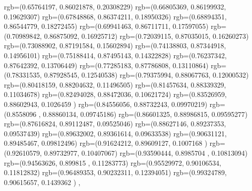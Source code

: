 {{{		  rgb=(0.65764197,  0.86021878,  0.20308229)
		  rgb=(0.66805369,  0.86199932,  0.19629307)
		  rgb=(0.67848868,  0.86374211,  0.18950326)
		  rgb=(0.68894351,  0.86544779,  0.18272455)
		  rgb=(0.69941463,  0.86711711,  0.17597055)
		  rgb=(0.70989842,  0.86875092,  0.16925712)
		  rgb=(0.72039115,  0.87035015,  0.16260273)
		  rgb=(0.73088902,  0.87191584,  0.15602894)
		  rgb=(0.74138803,  0.87344918,  0.14956101)
		  rgb=(0.75188414,  0.87495143,  0.14322828)
		  rgb=(0.76237342,  0.87642392,  0.13706449)
		  rgb=(0.77285183,  0.87786808,  0.13110864)
		  rgb=(0.78331535,  0.87928545,  0.12540538)
		  rgb=(0.79375994,  0.88067763,  0.12000532)
		  rgb=(0.80418159,  0.88204632,  0.11496505)
		  rgb=(0.81457634,  0.88339329,  0.11034678)
		  rgb=(0.82494028,  0.88472036,  0.10621724)
		  rgb=(0.83526959,  0.88602943,  0.1026459 )
		  rgb=(0.84556056,  0.88732243,  0.09970219)
		  rgb=(0.8558096 ,  0.88860134,  0.09745186)
		  rgb=(0.86601325,  0.88986815,  0.09595277)
		  rgb=(0.87616824,  0.89112487,  0.09525046)
		  rgb=(0.88627146,  0.89237353,  0.09537439)
		  rgb=(0.89632002,  0.89361614,  0.09633538)
		  rgb=(0.90631121,  0.89485467,  0.09812496)
		  rgb=(0.91624212,  0.89609127,  0.1007168 )
		  rgb=(0.92610579,  0.89732977,  0.10407067)
		  rgb=(0.93590444,  0.8985704 ,  0.10813094)
		  rgb=(0.94563626,  0.899815  ,  0.11283773)
		  rgb=(0.95529972,  0.90106534,  0.11812832)
		  rgb=(0.96489353,  0.90232311,  0.12394051)
		  rgb=(0.99324789,  0.90615657,  0.1439362 )
		},
	}
}